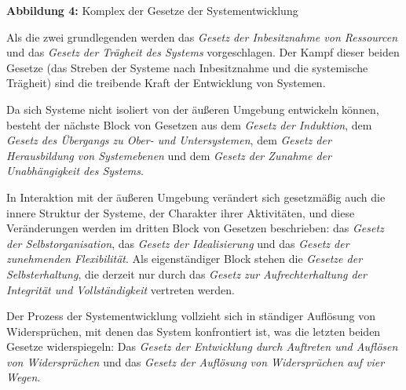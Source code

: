 \documentclass[11pt,a4paper]{article}
\begin{document}
\begin{center}
\end{center}
\textbf{Abbildung 4:} Komplex der Gesetze der Systementwicklung
\medskip

Als die zwei grundlegenden werden das \emph{Gesetz der Inbesitznahme von
  Ressourcen} und das \emph{Gesetz der Trägheit des Systems} vorgeschlagen.
Der Kampf dieser beiden Gesetze (das Streben der Systeme nach Inbesitznahme
und die systemische Trägheit) sind die treibende Kraft der Entwicklung von
Systemen.

Da sich Systeme nicht isoliert von der äußeren Umgebung entwickeln können,
besteht der nächste Block von Gesetzen aus dem \emph{Gesetz der Induktion},
dem \emph{Gesetz des Übergangs zu Ober- und Untersystemen}, dem \emph{Gesetz
  der Herausbildung von Systemebenen} und dem \emph{Gesetz der Zunahme der
  Unabhängigkeit des Systems}.

In Interaktion mit der äußeren Umgebung verändert sich gesetzmäßig auch die
innere Struktur der Systeme, der Charakter ihrer Aktivitäten, und diese
Veränderungen werden im dritten Block von Gesetzen beschrieben: das
\emph{Gesetz der Selbstorganisation}, das \emph{Gesetz der Idealisierung} und
das \emph{Gesetz der zunehmenden Flexibilität}.  Als eigenständiger Block
stehen die \emph{Gesetze der Selbsterhaltung}, die derzeit nur durch das
\emph{Gesetz zur Aufrechterhaltung der Integrität und Vollständigkeit}
vertreten werden.

Der Prozess der Systementwicklung vollzieht sich in ständiger Auflösung von
Widersprüchen, mit denen das System konfrontiert ist, was die letzten beiden
Gesetze widerspiegeln: Das \emph{Gesetz der Entwicklung durch Auftreten und
  Auflösen von Widersprüchen} und das \emph{Gesetz der Auflösung von
  Widersprüchen auf vier Wegen}.
\end{document}
